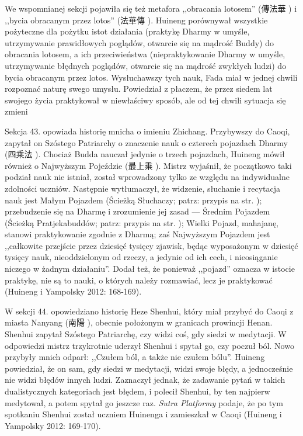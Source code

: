 We wspomnianej sekcji pojawiła się też metafora ,,obracania lotosem'' (傳法華 ) i ,,bycia obracanym przez lotos'' (法華傳 ).
Huineng porównywał wszystkie pożyteczne dla pożytku istot działania (praktykę Dharmy w umyśle, utrzymywanie prawidłowych poglądów, otwarcie się na mądrość Buddy) do obracania lotosem, a ich przeciwieństwa (niepraktykowanie Dharmy w umyśle, utrzymywanie błędnych poglądów, otwarcie się na mądrość zwykłych ludzi) do bycia obracanym przez lotos.
Wysłuchawszy tych nauk, Fada miał w jednej chwili rozpoznać naturę swego umysłu.
Powiedział z płaczem, że przez siedem lat swojego życia praktykował w niewłaściwy sposób, ale od tej chwili sytuacja się zmieni\ibid

Sekcja 43. opowiada historię mnicha o imieniu Zhichang.
Przybywszy do Caoqi, zapytał on Szóstego Patriarchy o znaczenie nauk o czterech pojazdach Dharmy (四乘法 ).\label{SiChengFa}
Chociaż Budda nauczał jedynie o trzech pojazdach, Huineng mówił również o Najwyższym Pojeździe (最上乘 ).
Mistrz wyjaśnił, że początkowo taki podział nauk nie istniał, został wprowadzony tylko ze względu na indywidualne zdolności uczniów.
Następnie wytłumaczył, że widzenie, słuchanie i recytacja nauk jest Małym Pojazdem (Ścieżką Słuchaczy; patrz: przypis na str. \pageref{Triyana});
przebudzenie się na Dharmę i zrozumienie jej zasad --- Średnim Pojazdem (Ścieżką Pratjekabuddów; patrz: przypis na str. \pageref{Triyana});
Wielki Pojazd, mahajanę, stanowi praktykowanie zgodnie z Dharmą; zaś Najwyższym Pojazdem jest ,,całkowite przejście przez dziesięć tysięcy zjawisk, będąc wyposażonym w dziesięć tysięcy nauk, nieoddzielonym od rzeczy, a jedynie od ich cech, i nieosiąganie niczego w żadnym działaniu''.
Dodał też, że ponieważ ,,pojazd'' oznacza w istocie praktykę, nie są to nauki, o których należy rozmawiać, lecz je praktykować
(Huineng i Yampolsky 2012: 168-169).

W sekcji 44. opowiedziano historię Heze Shenhui, który miał przybyć do Caoqi z miasta Nanyang (南陽 ), obecnie położonym w granicach prowincji Henan.
Shenhui zapytał Szóstego Patriarchę, czy widzi coś, gdy siedzi w medytacji.
W odpowiedzi mistrz trzykrotnie uderzył Shenhui i spytał go, czy poczuł ból.
Nowo przybyły mnich odparł: ,,Czułem ból, a także nie czułem bólu''.
Huineng powiedział, że on sam, gdy siedzi w medytacji, widzi swoje błędy, a jednocześnie nie widzi błędów innych ludzi.
Zaznaczył jednak, że zadawanie pytań w takich dualistycznych kategoriach jest błędem, i polecił Shenhui, by ten najpierw medytował, a potem spytał go jeszcze raz.
\textit{Sutra Platformy} podaje, że po tym spotkaniu Shenhui został uczniem Huinenga i zamieszkał w Caoqi
(Huineng i Yampolsky 2012: 169-170).

